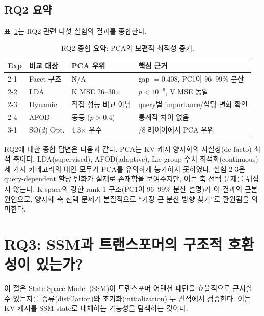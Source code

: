 \documentclass[11pt,a4paper]{article}
\begin{document}
\subsection{RQ2 요약}

표~\ref{tab:rq2_summary}는 RQ2 관련 다섯 실험의 결과를 종합한다.

\begin{table}[H]
\centering
\caption{RQ2 종합 요약: PCA의 보편적 최적성 증거.}
\label{tab:rq2_summary}
\small
\begin{tabularx}{\textwidth}{@{}lll>{\raggedright\arraybackslash}X@{}}
\toprule
\textbf{Exp} & \textbf{비교 대상} & \textbf{PCA 우위} & \textbf{핵심 근거} \\
\midrule
2-1 & Facet 구조 & N/A & gap $= 0.408$, PC1이 96--99\% 분산 \\
2-2 & LDA & K MSE 26--30$\times$ & $p < 10^{-6}$, V MSE 동일 \\
2-3 & Dynamic & 직접 성능 비교 아님 & query별 importance/할당 변화 확인 \\
2-4 & AFOD & 동등 ($p > 0.4$) & 통계적 차이 없음 \\
3-1 & SO($d$) Opt. & 4.3$\times$ 우수 & 8/8 레이어에서 PCA 우위 \\
\bottomrule
\end{tabularx}
\end{table}

RQ2에 대한 종합 답변은 다음과 같다. PCA는 KV 캐시 양자화의 사실상(de facto) 최적 축이다. LDA(supervised), AFOD(adaptive), Lie group 수치 최적화(continuous) 세 가지 카테고리의 대안 모두가 PCA를 유의하게 능가하지 못하였다. 실험 2-3은 query-dependent 할당 변화가 실제로 존재함을 보여주지만, 이는 축 선택 문제를 뒤집지 않는다. K-space의 강한 rank-1 구조(PC1이 96--99\% 분산 설명)가 이 결과의 근본 원인으로, 양자화 축 선택 문제가 본질적으로 ``가장 큰 분산 방향 찾기''로 환원됨을 의미한다.

\newpage

\section{RQ3: SSM과 트랜스포머의 구조적 호환성이 있는가?}

이 절은 State Space Model (SSM)이 트랜스포머 어텐션 패턴을 효율적으로 근사할 수 있는지를 증류(distillation)와 초기화(initialization) 두 관점에서 검증한다. 이는 KV 캐시를 SSM state로 대체하는 가능성을 탐색하는 것이다.
\end{document}
